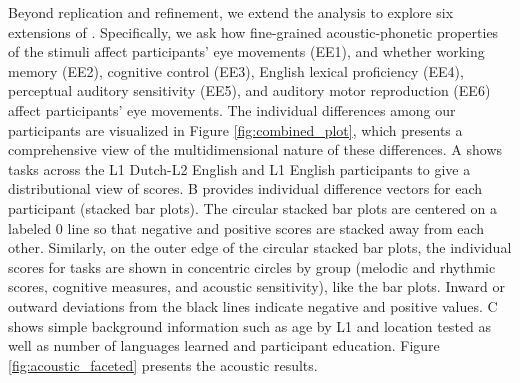 Beyond replication and refinement, we extend the analysis to explore six extensions of \cite{ge2021a}. Specifically, we ask how fine-grained acoustic-phonetic properties of the stimuli affect participants' eye movements (EE1), and whether working memory (EE2), cognitive control (EE3), English lexical proficiency (EE4), perceptual auditory sensitivity (EE5), and auditory motor reproduction (EE6) affect participants' eye movements. The individual differences among our participants are visualized in Figure \ref{fig:combined_plot}, which presents a comprehensive view of the multidimensional nature of these differences. A shows tasks across the L1 Dutch-L2 English and L1 English participants to give a distributional view of scores. B provides individual difference vectors for each participant (stacked bar plots). The circular stacked bar plots are centered on a labeled 0 line so that negative and positive scores are stacked away from each other. Similarly, on the outer edge of the circular stacked bar plots, the individual scores for tasks are shown in concentric circles by group (melodic and rhythmic scores, cognitive measures, and acoustic sensitivity), like the bar plots. Inward or outward deviations from the black lines indicate negative and positive values. C shows simple background information such as age by L1 and location tested as well as number of languages learned and participant education. Figure \ref{fig:acoustic_faceted} presents the acoustic results.


